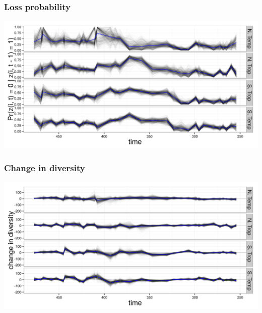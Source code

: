 \documentclass{beamer}
\begin{document}
\begin{frame}
  \frametitle{Loss probability}
  \begin{center}
    \includegraphics[width=\textwidth,height=0.8\textheight,keepaspectratio=true]{figure/extinction}
  \end{center}
\end{frame}

\begin{frame}
  \frametitle{Change in diversity}
  \begin{center}
    \includegraphics[width=\textwidth,height=0.8\textheight,keepaspectratio=true]{figure/est_diff}
  \end{center}
\end{frame}
\end{document}
